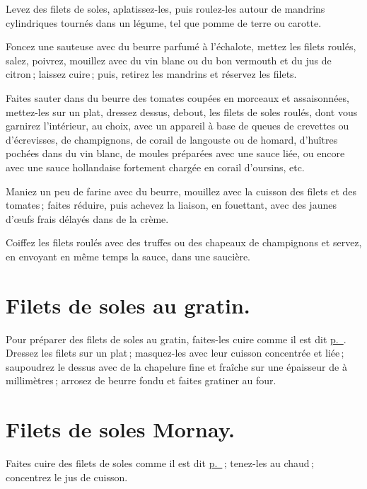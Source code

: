 Levez des filets de soles, aplatissez-les, puis roulez-les autour de mandrins
cylindriques tournés dans un légume, tel que pomme de terre ou carotte.

Foncez une sauteuse avec du beurre parfumé à l'échalote, mettez les filets
roulés, salez, poivrez, mouillez avec du vin blanc ou du bon vermouth et du jus
de citron ; laissez cuire ; puis, retirez les mandrins et réservez les filets.

Faites sauter dans du beurre des tomates coupées en morceaux et assaisonnées,
mettez-les sur un plat, dressez dessus, debout, les filets de soles roulés,
dont vous garnirez l'intérieur, au choix, avec un appareil à base de queues de
crevettes ou d'écrevisses, de champignons, de corail de langouste ou de homard,
d'huîtres pochées dans du vin blanc, de moules préparées avec une sauce liée,
ou encore avec une sauce hollandaise fortement chargée en corail d'oursins,
etc.

Maniez un peu de farine avec du beurre, mouillez avec la cuisson des filets et
des tomates ; faites réduire, puis achevez la liaison, en fouettant, avec des
jaunes d'œufs frais délayés dans de la crème.

Coiffez les filets roulés avec des truffes ou des chapeaux de champignons et
servez, en envoyant en même temps la sauce, dans une saucière.

\section*{\centering Filets de soles au gratin.}

Pour préparer des filets de soles au gratin, faites-les cuire comme il est dit
\hyperlink{p0363}{p. \pageref{pg0363}}. Dressez les filets sur un plat ;
masquez-les avec leur cuisson concentrée et liée ; saupoudrez le dessus avec de
la chapelure fine et fraîche sur une épaisseur de {\mmm} à {\mmm}
millimètres ; arrosez de beurre fondu et faites gratiner au four.

\section*{\centering Filets de soles Mornay.}

Faites cuire des filets de soles comme il est dit
\hyperlink{p0363}{p. \pageref{pg0363}} ; tenez-les au chaud ; concentrez le jus de
cuisson.

